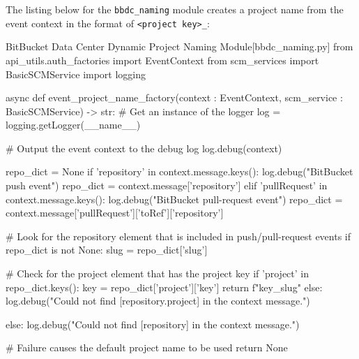 The listing below for the \texttt{bbdc\_naming} module creates a project name from
the event context in the format of \texttt{<project key>\_<repository name>}:

\begin{code}{BitBucket Data Center Dynamic Project Naming Module}{[bbdc\_naming.py]}{}
from api_utils.auth_factories import EventContext
from scm_services import BasicSCMService
import logging

async def event_project_name_factory(context : EventContext, scm_service : BasicSCMService) -> str:
  # Get an instance of the logger
  log = logging.getLogger(__name__)

  # Output the event context to the debug log
  log.debug(context)

  repo_dict = None
  if 'repository' in context.message.keys():
    log.debug("BitBucket push event")
    repo_dict = context.message['repository']
  elif 'pullRequest' in context.message.keys():
    log.debug("BitBucket pull-request event")
    repo_dict = context.message['pullRequest']['toRef']['repository']

  # Look for the repository element that is included in push/pull-request events
  if repo_dict is not None:
    slug = repo_dict['slug']

    # Check for the project element that has the project key
    if 'project' in repo_dict.keys():
      key = repo_dict['project']['key']
      return f"{key}_{slug}"
    else:
      log.debug("Could not find [repository.project] in the context message.")

  else:
    log.debug("Could not find [repository] in the context message.")

  # Failure causes the default project name to be used
  return None
\end{code}

